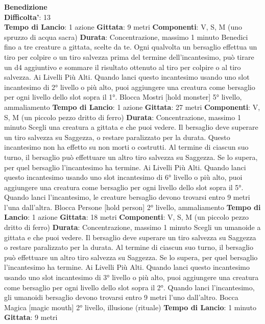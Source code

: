 \begin{multicols}{2}
\medskip\textbf{Benedizione}\\
\textbf{Difficolta'}: 13\\
\textbf{Tempo di Lancio}: 1 azione
\textbf{Gittata}: 9 metri
\textbf{Componenti}: V, S, M (uno spruzzo di acqua sacra)
\textbf{Durata}: Concentrazione, massimo 1 minuto
Benedici fino a tre creature a gittata, scelte da te. Ogni
qualvolta un bersaglio effettua un tiro per colpire o un
tiro salvezza prima del termine dell’incantesimo, può
tirare un d4 aggiuntivo e sommare il risultato ottenuto al
tiro per colpire o al tiro salvezza.
Ai Livelli Più Alti. Quando lanci questo incantesimo
usando uno slot incantesimo di 2° livello o più alto, puoi
aggiungere una creatura come bersaglio per ogni livello
dello slot sopra il 1°.
Blocca Mostri
[hold monster]
5° livello, ammaliamento
\textbf{Tempo di Lancio}: 1 azione
\textbf{Gittata}: 27 metri
\textbf{Componenti}: V, S, M (un piccolo pezzo dritto di ferro)
\textbf{Durata}: Concentrazione, massimo 1 minuto
Scegli una creatura a gittata e che puoi vedere. Il
bersaglio deve superare un tiro salvezza su Saggezza,
o restare paralizzato per la durata. Questo incantesimo
non ha effetto su non morti o costrutti. Al termine di
ciascun suo turno, il bersaglio può effettuare un altro
tiro salvezza su Saggezza. Se lo supera, per quel
bersaglio l’incantesimo ha termine.
Ai Livelli Più Alti. Quando lanci questo incantesimo
usando uno slot incantesimo di 6° livello o più alto, puoi
aggiungere una creatura come bersaglio per ogni livello
dello slot sopra il 5°. Quando lanci l’incantesimo, le
creature bersaglio devono trovarsi entro 9 metri l’una
dall’altra.
Blocca Persone
[hold person]
2° livello, ammaliamento
\textbf{Tempo di Lancio}: 1 azione
\textbf{Gittata}: 18 metri
\textbf{Componenti}: V, S, M (un piccolo pezzo dritto di ferro)
\textbf{Durata}: Concentrazione, massimo 1 minuto
Scegli un umanoide a gittata e che puoi vedere. Il
bersaglio deve superare un tiro salvezza su Saggezza
o restare paralizzato per la durata. Al termine di ciascun
suo turno, il bersaglio può effettuare un altro tiro
salvezza su Saggezza. Se lo supera, per quel bersaglio
l’incantesimo ha termine.
Ai Livelli Più Alti. Quando lanci questo incantesimo
usando uno slot incantesimo di 3° livello o più alto, puoi
aggiungere una creatura come bersaglio per ogni livello
dello slot sopra il 2°. Quando lanci l’incantesimo, gli
umanoidi bersaglio devono trovarsi entro 9 metri l’uno
dall’altro.
Bocca Magica
[magic mouth]
2° livello, illusione (rituale)
\textbf{Tempo di Lancio}: 1 minuto
\textbf{Gittata}: 9 metri

\end{multicols}
